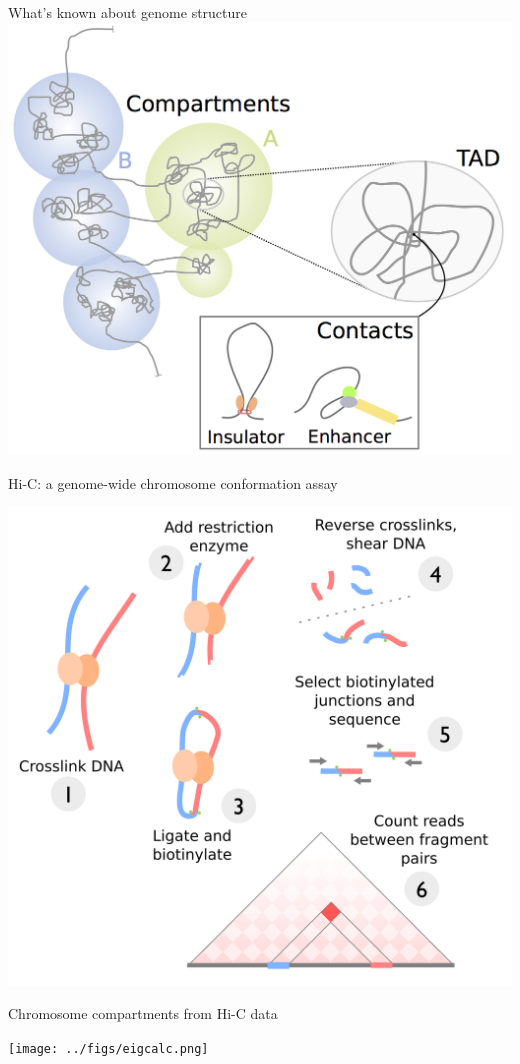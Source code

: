 \documentclass{beamer}
\begin{document}
\begin{frame}{What's known about genome structure}
\centering
\includegraphics[width=.8\textwidth]{../figs/genome_org.png}

\end{frame}

\begin{frame}{Hi-C: a genome-wide chromosome conformation assay }

\centering
\includegraphics[width=.8\textwidth]{../figs/hic.png}

\end{frame}


\begin{frame}{Chromosome compartments from Hi-C data }

\centering
\texttt{[image: ../figs/eigcalc.png]}

\end{frame}
\end{document}
